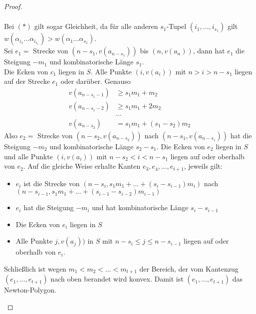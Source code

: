 \begin{proof}
\begin{enumerate}[(1)]
\begin{align*}
\end{align*}
Bei $(*)$ gilt sogar Gleichheit, da für alle anderen $s_1$-Tupel $(i_1, \dots, i_{s_1})$ gilt \linebreak $w(\alpha_{i_1} \dots \alpha_{i_{s_1}})>w(\alpha_1 \dots \alpha_{s_1})$.\\
Sei $e_1=$ Strecke von $(n-s_1, v(a_{n-s_1}))$ bis $(n, v(a_n))$, dann hat $e_1$ die Steigung $-m_1$ und kombinatorische Länge $s_1$.\\
Die Ecken von $c_1$ liegen in $S$. Alle Punkte $(i, v(a_i))$ mit $n>i>n-s_1$ liegen auf der Strecke $e_1$ oder darüber. Genauso
\begin{align*}
v(a_{n-s_1-1})&\geq s_1m_1+m_2\\
v(a_{n-s_1-2})&\geq s_1m_1+2m_2\\
&\dots\\
v(a_{n-s_2})&=s_1m_1+(s_1-s_2)m_2
\end{align*}
Also $e_2=$ Strecke von $(n-s_2, v(a_{n-s_2}))$ nach $(n-s_1, v(a_{n-s_1}))$ hat die Steigung $-m_2$ und kombinatorische Länge $s_2-s_1$. Die Ecken von $e_2$ liegen in $S$ und alle Punkte $(i, v(a_i))$ mit $n-s_2 < i<n-s_1$ liegen auf oder oberhalb von $e_2$. Auf die gleiche Weise erhalte Kanten $e_3, e_4, \dots, e_{t+1}$, jeweils gilt:
\begin{itemize}
\item $e_i$ ist die Strecke von $(n-s_i, s_1m_1+\dots+(s_i-s_{i-1})m_i)$ nach $(n-s_{i-1}, s_1m_1+\dots+(s_{i-1}-s_{i-2})m_{i-1})$
\item $e_i$ hat die Steigung $-m_i$ und hat kombinatorische Länge $s_i-s_{i-1}$
\item Die Ecken von $e_i$ liegen in $S$
\item Alle Punkte $j, v(a_j))$ in $S$ mit $n-s_i \leq j \leq n-{s_{i-1}}$ liegen auf oder oberhalb von $e_i$.
\end{itemize}
Schließlich ist wegen $m_1 < m_2 < \dots < m_{t+1}$ der Bereich, der vom Kantenzug $(e_1, \dots, e_{t+1})$ nach oben berandet wird konvex. Damit ist $(e_1, \dots , e_{t+1})$ das Newton-Polygon.
\end{enumerate}
\end{proof}

